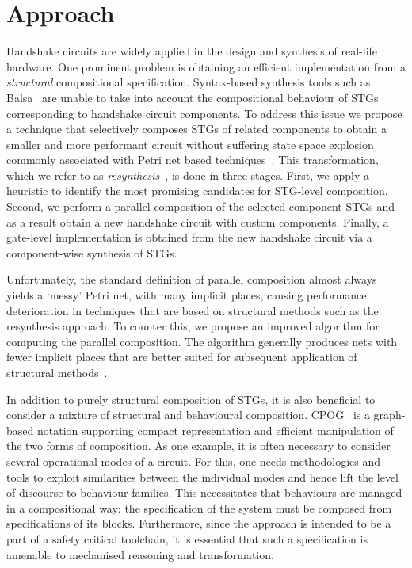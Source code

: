 \chapter{Approach}



Handshake circuits are widely applied in the design and synthesis of real-life hardware.
One prominent problem is obtaining an efficient implementation from a \emph{structural} compositional specification.
Syntax-based synthesis tools such as Balsa~\cite{balsa} are unable to take into account the compositional
behaviour of STGs corresponding to handshake circuit components. To address this issue we propose 
a technique that selectively composes STGs of related components to obtain a smaller and more performant
circuit without suffering state space explosion commonly associated with Petri net based techniques~\cite{Valmari}.
This transformation, which we refer to as \emph{resynthesis}~\cite{ukaf_balsa_resynthesis}, is done in three stages. First, we apply a heuristic to identify the most promising candidates for STG-level composition. Second, we perform a parallel composition of the selected component STGs and as a result obtain a new handshake circuit with custom components. Finally, a gate-level implementation is obtained from the new handshake circuit via a component-wise synthesis of STGs.

Unfortunately, the standard definition of parallel composition almost always yields a `messy' Petri net, with many implicit places, causing performance deterioration in techniques that are based on structural methods such as the resynthesis approach. To counter this, we propose an improved algorithm for computing the parallel composition. The algorithm generally produces nets with fewer implicit places that are better suited for subsequent application of structural methods~\cite{improved_par_comp}.

In addition to purely structural composition of STGs, it is also beneficial to consider a mixture of 
structural and behavioural composition. CPOG~\cite{2009_mokhov_phd} is a graph-based notation supporting compact
representation and efficient manipulation of the two forms of composition. As one example, it is
often necessary to consider several operational modes of a circuit. 
For this, one needs methodologies and tools to exploit similarities between
the individual modes and hence lift the level of discourse to behaviour families.
This necessitates that behaviours are managed in a compositional
way: the specification of the system must be composed from specifications
of its blocks. Furthermore, since the approach is intended to be a part of a safety critical toolchain, it is essential that such a  specification is amenable to mechanised reasoning and transformation.

